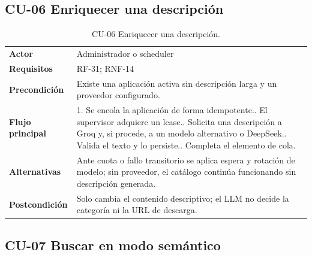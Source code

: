 \subsection{CU-06 Enriquecer una descripción}

\begin{table}[H]
\centering
\begin{tabularx}{\textwidth}{p{}X}
\toprule
\textbf{Actor} & Administrador o scheduler\\
\textbf{Requisitos} & RF-31; RNF-14\\
\textbf{Precondición} & Existe una aplicación activa sin descripción larga y un proveedor configurado.\\
\textbf{Flujo principal} & 1. Se encola la aplicación de forma idempotente.\newline
2. El supervisor adquiere un lease.\newline
3. Solicita una descripción a Groq y, si procede, a un modelo alternativo o DeepSeek.\newline
4. Valida el texto y lo persiste.\newline
5. Completa el elemento de cola.\\
\textbf{Alternativas} & Ante cuota o fallo transitorio se aplica espera y rotación de modelo; sin proveedor, el catálogo continúa funcionando sin descripción generada.\\
\textbf{Postcondición} & Solo cambia el contenido descriptivo; el LLM no decide la categoría ni la URL de descarga.\\
\bottomrule
\end{tabularx}
\caption{CU-06 Enriquecer una descripción.}
\label{tabla:cu-enriquecer-descripcion}
\end{table}

\subsection{CU-07 Buscar en modo semántico}


